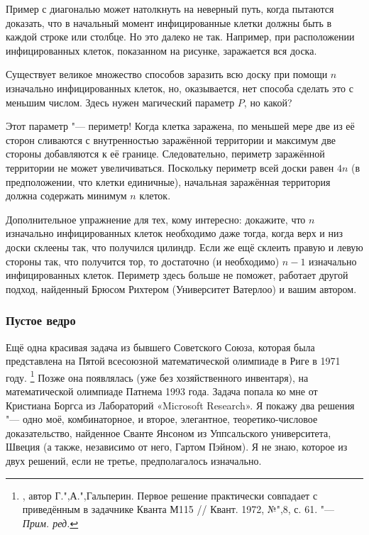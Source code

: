\documentclass[twoside]{book}
\begin{document}
\medskip

Пример с диагональю может натолкнуть на неверный путь, когда пытаются доказать, что в начальный момент инфицированные клетки должны быть в каждой строке или столбце.
Но это далеко не так.
Например, при расположении инфицированных клеток, показанном на рисунке, заражается вся доска.


Существует великое множество способов заразить всю доску при помощи $n$ изначально инфицированных клеток, но, оказывается, нет способа сделать это с меньшим числом.
Здесь нужен магический параметр $P$, но какой?

Этот параметр "--- периметр!
Когда клетка заражена, по меньшей мере две из её сторон сливаются с внутренностью заражённой территории и максимум две стороны добавляются к её границе.
Следовательно, периметр заражённой территории не может увеличиваться.
Поскольку периметр всей доски равен $4n$ (в предположении, что клетки единичные), начальная заражённая территория должна содержать минимум $n$ клеток.
\heart

Дополнительное упражнение для тех, кому интересно: докажите, что $n$ изначально инфицированных клеток необходимо даже тогда, когда верх и низ доски склеены так, что получился цилиндр.
Если же ещё склеить правую и левую стороны так, что получится тор, то достаточно (и необходимо) $n-1$ изначально инфицированных клеток.
Периметр здесь больше не поможет,
работает другой подход, найденный Брюсом Рихтером (Университет Ватерлоо) %
и вашим автором.

\subsubsection*{Пустое ведро}%

Ещё одна красивая задача из бывшего Советского Союза, которая была представлена на Пятой всесоюзной математической олимпиаде в Риге в 1971 году.%
\footnote{\cite[№148]{ВсМО}, автор Г.",А.",Гальперин.
Первое решение практически совпадает с приведённым в задачнике Кванта М115 /\!/ {Квант}. 1972, №",8, с. 61. "--- \emph{Прим. ред.}}
Позже она появлялась (уже без хозяйственного инвентаря), на математической олимпиаде Патнема 1993 года.
Задача попала ко мне от Кристиана Боргса из Лабораторий «Microsoft Research». %
Я покажу два решения "--- одно моё, комбинаторное, и второе, элегантное, теоретико-числовое доказательство, найденное Сванте Янсоном из Уппсальского университета, Швеция %
(а также, независимо от него, Гартом Пэйном). %
Я не знаю, которое из двух решений, если не третье, предполагалось изначально.
\end{document}
